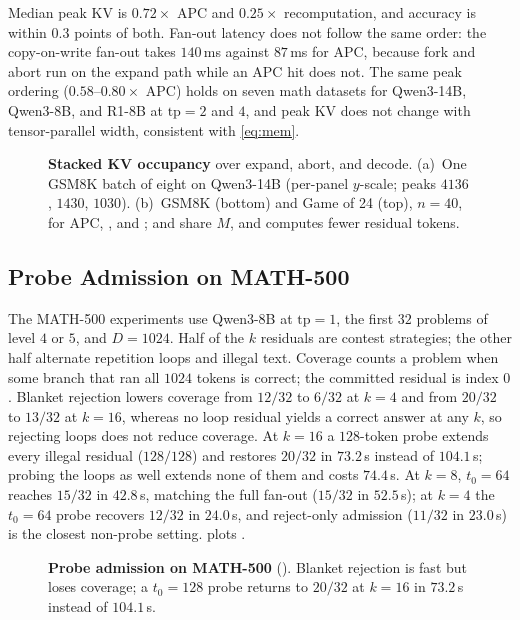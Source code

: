 Median peak KV is $0.72\times$ APC and $0.25\times$ recomputation, and accuracy is within $0.3$ points of both.
Fan-out latency does not follow the same order: the copy-on-write fan-out takes $140$\,ms against $87$\,ms for APC, because fork and abort run on the expand path while an APC hit does not.
The same peak ordering ($0.58$--$0.80\times$ APC) holds on seven math datasets for Qwen3-14B, Qwen3-8B, and R1-8B at $\mathrm{tp}{=}2$ and $4$, and peak KV does not change with tensor-parallel width, consistent with \eqref{eq:mem}.

\begin{figure}[t]
\centering
\resizebox{\textwidth}{!}{}
\caption{\textbf{Stacked KV occupancy} over expand, abort, and decode.
(a)~One GSM8K batch of eight on Qwen3-14B (per-panel $y$-scale; peaks $4136$, $1430$, $1030$).
(b)~GSM8K (bottom) and Game of 24 (top), $n{=}40$, for APC, \cowonly, and \sys; \cowonly and \sys share $M$, and \sys computes fewer residual tokens.}
\label{fig:eval-stack}
\end{figure}

\subsection{Probe Admission on MATH-500}
\label{sec:eval-grow}

The MATH-500 experiments use Qwen3-8B at $\mathrm{tp}{=}1$, the first $32$ problems of level $4$ or $5$, and $D{=}1024$.
Half of the $k$ residuals are contest strategies; the other half alternate repetition loops and illegal text.
Coverage counts a problem when some branch that ran all $1024$ tokens is correct; the committed residual is index $0$.
Blanket rejection lowers coverage from $12/32$ to $6/32$ at $k{=}4$ and from $20/32$ to $13/32$ at $k{=}16$, whereas no loop residual yields a correct answer at any $k$, so rejecting loops does not reduce coverage.
At $k{=}16$ a $128$-token probe extends every illegal residual ($128/128$) and restores $20/32$ in $73.2$\,s instead of $104.1$\,s; probing the loops as well extends none of them and costs $74.4$\,s.
At $k{=}8$, $t_0{=}64$ reaches $15/32$ in $42.8$\,s, matching the full fan-out ($15/32$ in $52.5$\,s); at $k{=}4$ the $t_0{=}64$ probe recovers $12/32$ in $24.0$\,s, and reject-only admission ($11/32$ in $23.0$\,s) is the closest non-probe setting.
 plots .

\begin{figure}[t]
\centering
\resizebox{\textwidth}{!}{}
\caption{\textbf{Probe admission on MATH-500} ().
Blanket rejection is fast but loses coverage; a $t_0{=}128$ probe returns to $20/32$ at $k{=}16$ in $73.2$\,s instead of $104.1$\,s.}
\label{fig:eval-grow}
\end{figure}

